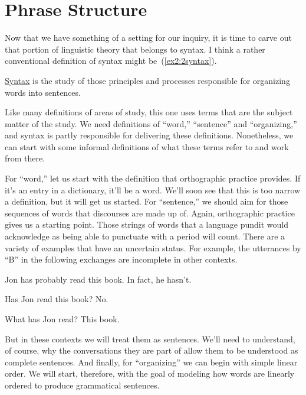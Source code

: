 \chapter{Phrase Structure}
\label{ch:phrasestructure}
\setcounter{exx}{0}

\noindent
Now that we have something of a setting for our inquiry, it is time to carve out that portion of linguistic theory that belongs to syntax. I think a rather conventional definition of syntax might be~(\ref{ex2:2syntax}).
\begin{exe}
	\ex \label{ex2:2syntax} \uline{Syntax} is the study of those principles and processes responsible for organizing words into sentences.
\end{exe}
Like many definitions of areas of study, this one uses terms that are the subject matter of the study. We need definitions of ``word,'' ``sentence'' and ``organizing,'' and syntax is partly responsible for delivering these definitions. Nonetheless, we can start with some informal definitions of what these terms refer to and work from there.

For ``word,'' let us start with the definition that orthographic practice provides. If it's an entry in a dictionary, it'll be a word. We'll soon see that this is too narrow a definition, but it will get us started. For ``sentence,'' we should aim for those sequences of words that discourses are made up of. Again, orthographic practice gives us a starting point. Those strings of words that a language pundit would acknowledge as being able to punctuate with a period will count. There are a variety of examples that have an uncertain status. For example, the utterances by ``B'' in the following exchanges are incomplete in other contexts.\label{defsyn}
\begin{exe}
	\ex \label{ex2:2senta} 
	\begin{xlist}
		 Jon has probably read this book.
		 In fact, he hasn't.
	\end{xlist}
	\ex \label{ex2:2sentb}
	\begin{xlist}
		 Has Jon read this book?
		\exi{B:} No.
	\end{xlist}
	\ex \label{ex2:2sentc}
	\begin{xlist}
		 What has Jon read?
		 This book.
	\end{xlist}
\end{exe}
But in these contexts we will treat them as sentences. We'll need to understand, of course, why the conversations they are part of allow them to be understood as complete sentences. And finally, for ``organizing'' we can begin with simple linear order. We will start, therefore, with the goal of modeling how words are linearly ordered to produce grammatical sentences.

